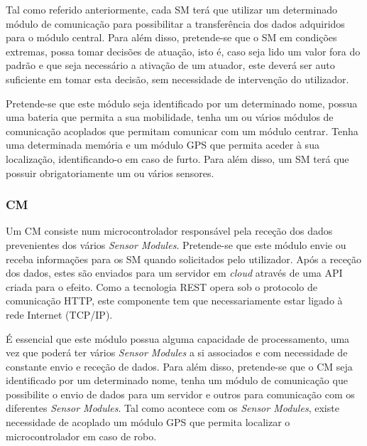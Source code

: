Tal como referido anteriormente, cada \acl{SM} terá que utilizar um determinado módulo de comunicação para possibilitar a transferência dos dados adquiridos para o módulo central. Para além disso, pretende-se que o \acl{SM} em condições extremas, possa tomar decisões de atuação, isto é, caso seja lido um valor fora do padrão e que seja necessário a ativação de um atuador, este deverá ser auto suficiente em tomar esta decisão, sem necessidade de intervenção do utilizador. 

Pretende-se que este módulo seja identificado por um determinado nome, possua uma bateria que permita a sua mobilidade, tenha um ou vários módulos de comunicação acoplados que permitam comunicar com um módulo centrar. Tenha uma determinada memória e um módulo \ac{GPS} que permita aceder à sua localização, identificando-o em caso de furto. Para além disso, um \acl{SM} terá que possuir obrigatoriamente um ou vários sensores.








\subsubsection{\acl{CM}}



Um \acl{CM} consiste num microcontrolador responsável pela receção dos dados prevenientes dos vários \textit{Sensor Modules}. Pretende-se que este módulo envie ou receba informações para os \acl{SM} quando solicitados pelo utilizador. Após a receção dos dados, estes são enviados para um servidor em \textit{cloud} através de uma \ac{API} criada para o efeito. Como a tecnologia \ac{REST} opera sob o protocolo de comunicação \ac{HTTP}, este componente tem que necessariamente estar ligado à rede Internet (\ac{TCP}/\ac{IP}). 

É essencial que este módulo possua alguma capacidade de processamento, uma vez que poderá ter vários \textit{Sensor Modules} a si associados e com necessidade de constante envio e receção de dados.  Para além disso, pretende-se que o \acl{CM} seja identificado por um determinado nome, tenha um  módulo de comunicação que possibilite o envio de dados para um servidor e outros para comunicação com os diferentes \textit{Sensor Modules}. Tal como acontece com os \textit{Sensor Modules}, existe necessidade de acoplado um módulo \ac{GPS} que permita localizar o microcontrolador em caso de robo.
 






